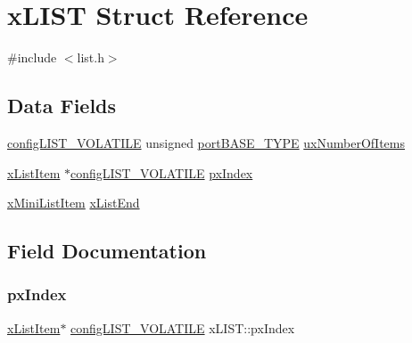 \hypertarget{structx_l_i_s_t}{}\section{x\+L\+I\+ST Struct Reference}
\label{structx_l_i_s_t}


{\ttfamily \#include $<$list.\+h$>$}

\subsection*{Data Fields}
\begin{DoxyCompactItemize}
\item 
\mbox{\hyperlink{list_8h_a2d5de557c5561c8980d1bf51d87d8cba}{config\+L\+I\+S\+T\+\_\+\+V\+O\+L\+A\+T\+I\+LE}} unsigned \mbox{\hyperlink{portmacro_8h_a1ebe82d24d764ae4e352f7c3a9f92c01}{port\+B\+A\+S\+E\+\_\+\+T\+Y\+PE}} \mbox{\hyperlink{structx_l_i_s_t_a268fd44743a3b6d3cd4dd36a72a678fa}{ux\+Number\+Of\+Items}}
\item 
\mbox{\hyperlink{list_8h_abc3e65a10b5c5f39142e64e69311797f}{x\+List\+Item}} $\ast$\mbox{\hyperlink{list_8h_a2d5de557c5561c8980d1bf51d87d8cba}{config\+L\+I\+S\+T\+\_\+\+V\+O\+L\+A\+T\+I\+LE}} \mbox{\hyperlink{structx_l_i_s_t_a7d75e67f799b751c7e37820df2172f63}{px\+Index}}
\item 
\mbox{\hyperlink{list_8h_a9fb3b8c76f89efd6b8787f66e94ba04c}{x\+Mini\+List\+Item}} \mbox{\hyperlink{structx_l_i_s_t_a919ec0b26ba08c9787675b6161f7e318}{x\+List\+End}}
\end{DoxyCompactItemize}


\subsection{Field Documentation}
\mbox{\label{structx_l_i_s_t_a7d75e67f799b751c7e37820df2172f63}} 
\subsubsection{\texorpdfstring{px\+Index}{pxIndex}}
{\footnotesize\ttfamily \mbox{\hyperlink{list_8h_abc3e65a10b5c5f39142e64e69311797f}{x\+List\+Item}}$\ast$ \mbox{\hyperlink{list_8h_a2d5de557c5561c8980d1bf51d87d8cba}{config\+L\+I\+S\+T\+\_\+\+V\+O\+L\+A\+T\+I\+LE}} x\+L\+I\+S\+T\+::px\+Index}

\mbox{\label{structx_l_i_s_t_a268fd44743a3b6d3cd4dd36a72a678fa}} 
